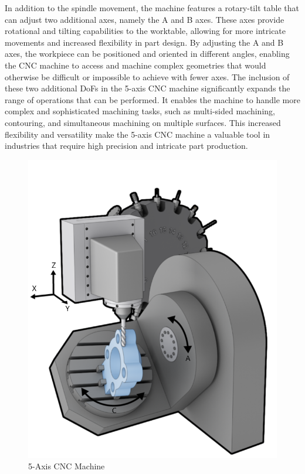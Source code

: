 In addition to the spindle movement, the machine features a rotary-tilt table that can adjust two additional axes, namely the A and B axes. These axes provide rotational and tilting capabilities to the worktable, allowing for more intricate movements and increased flexibility in part design. By adjusting the A and B axes, the workpiece can be positioned and oriented in different angles, enabling the \acrshort{CNC} machine to access and machine complex geometries that would otherwise be difficult or impossible to achieve with fewer axes. %
The inclusion of these two additional \acrshort{DoF}s in the 5-axis \acrshort{CNC} machine significantly expands the range of operations that can be performed. It enables the machine to handle more complex and sophisticated machining tasks, such as multi-sided machining, contouring, and simultaneous machining on multiple surfaces. This increased flexibility and versatility make the 5-axis \acrshort{CNC} machine a valuable tool in industries that require high precision and intricate part production.

\begin{figure}[H]
	\centerline{\includegraphics[scale=.5]{figures/5ax.png}}
	\caption{5-Axis CNC Machine~\cite{5ax}}
	\label{5ax}
\end{figure}



